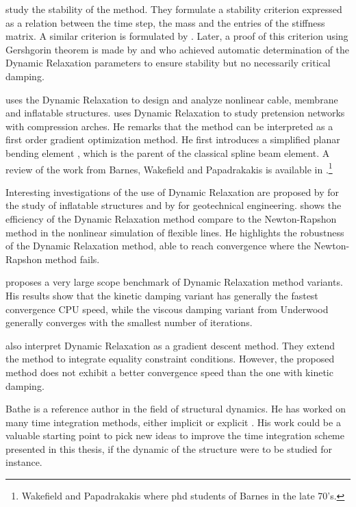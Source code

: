  study the stability of the method. They formulate a stability criterion expressed as a relation between the time step, the mass and the entries of the stiffness matrix. A similar criterion is formulated by . Later, a proof of this criterion using Gershgorin theorem is made by  and  who achieved automatic determination of the Dynamic Relaxation parameters to ensure stability but no necessarily critical damping.

 uses the Dynamic Relaxation to design and analyze nonlinear cable, membrane and inflatable structures.  uses Dynamic Relaxation to study pretension networks with compression arches. He remarks that the method can be interpreted as a first order gradient optimization method. He first introduces a simplified planar bending element \cite[p.~120]{Wakefield1980}, which is the parent of the classical  spline beam element. A review of the work from Barnes, Wakefield and Papadrakakis is available in \cite{Barnes1999}.\footnote{Wakefield and Papadrakakis where phd students of Barnes in the late 70's.}

Interesting investigations of the use of Dynamic Relaxation are proposed by \cite{Rodriguez2011a} for the study of inflatable structures and by  for geotechnical engineering.  shows the efficiency of the Dynamic Relaxation method compare to the Newton-Rapshon method in the nonlinear simulation of flexible lines. He highlights the robustness of the Dynamic Relaxation method, able to reach convergence where the Newton-Rapshon method fails.

 proposes a very large scope benchmark of Dynamic Relaxation method variants. His results show that the kinetic damping variant \cite{
Topping2007} has generally the fastest convergence CPU speed, while the viscous damping variant from Underwood \cite{Underwood1983} generally converges with the smallest number of iterations.

 also interpret Dynamic Relaxation as a gradient descent method. They extend the method to integrate equality constraint conditions. However, the proposed method does not exhibit a better convergence speed than the one with kinetic damping.

Bathe is a reference author in the field of structural dynamics. He has worked on many time integration methods, either implicit or explicit \cite{Noh2013}. His work could be a valuable starting point to pick new ideas to improve the time integration scheme presented in this thesis, if the dynamic of the structure were to be studied for instance.

